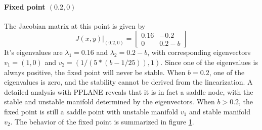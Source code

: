 \paragraph{Fixed point $(0.2,0)$}\hfill\newline
The Jacobian matrix at this point is given by 
\begin{equation}
J(x,y)|_{(0.2,0)}=\begin{bmatrix}
0.16 & -0.2 \\
0 & 0.2-b
\end{bmatrix}
\end{equation}
It's eigenvalues are $\lambda_1=0.16$ and $\lambda_2=0.2-b$, with corresponding eigenvectors $v_1=(1,0)$ and $v_2=(1/(5*(b - 1/25)),1)$. Since one of the eigenvalues is always positive, the fixed point will never be stable. When $b=0.2$, one of the eigenvalues is zero, and the stability cannot be derived from the linearization. A detailed analysis with PPLANE reveals that it is in fact a saddle node, with the stable and unstable manifold determined by the eigenvectors. When $b>0.2$, the fixed point is still a saddle point with unstable manifold $v_1$ and stable manifold $v_2$. The behavior of the fixed point is summarized in figure \ref{fig:ex3020}.
\begin{figure}[H]
\centering
{}
\caption{}
\label{fig:ex3020}
\end{figure}
